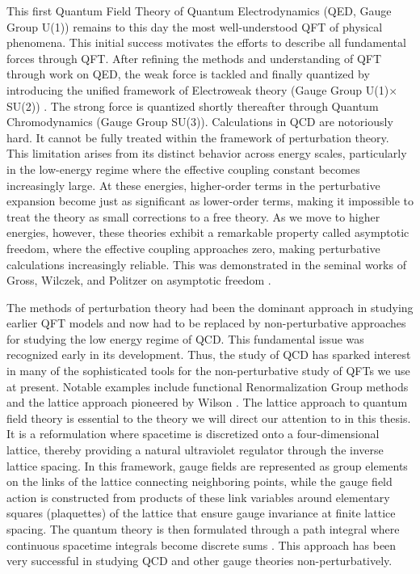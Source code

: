 This first Quantum Field Theory of Quantum Electrodynamics (QED, Gauge Group
U(1)) remains to this day the most well-understood QFT of physical phenomena.
This initial success motivates the efforts to describe all fundamental forces
through QFT. After refining the methods and understanding of QFT through work
on QED, the weak force is tackled and finally quantized by introducing the
unified framework of Electroweak theory (Gauge Group U(1)$\times$SU(2))
\cite{glashowRenormalizabilityVectorMeson1959,salamWeakElectromagneticInteractions1959,weinbergModelLeptons1967}.
The strong force is quantized shortly thereafter through Quantum Chromodynamics
(Gauge Group
SU(3))\cite{grossUltravioletBehaviorNonAbelian1973,politzerReliablePerturbativeResults1973}.
Calculations in QCD are notoriously hard. It cannot be fully treated within the
framework of perturbation theory. This limitation arises from its distinct
behavior across energy scales, particularly in the low-energy regime where the
effective coupling constant becomes increasingly large. At these energies,
higher-order terms in the perturbative expansion become just as significant as
lower-order terms, making it impossible to treat the theory as small
corrections to a free theory. As we move to higher energies, however, these
theories exhibit a remarkable property called asymptotic freedom, where the
effective coupling approaches zero, making perturbative calculations
increasingly reliable. This was demonstrated in the seminal works of Gross,
Wilczek, and Politzer on asymptotic freedom
\cite{grossAsymptoticallyFreeGauge1973,davidpolitzerAsymptoticFreedomApproach1974}.

The methods of perturbation theory had been the dominant approach in studying
earlier QFT models and now had to be replaced by non-perturbative approaches
for studying the low energy regime of QCD. This fundamental issue was
recognized early in its development. Thus, the study of QCD has sparked
interest in many of the sophisticated tools for the non-perturbative study of
QFTs we use at present. Notable examples include functional Renormalization
Group methods and the lattice approach pioneered by Wilson
\cite{wilsonConfinementQuarks1974}. The lattice approach to quantum field
theory is essential to the theory we will direct our attention to in this
thesis. It is a reformulation where spacetime is discretized onto a
four-dimensional lattice, thereby providing a natural ultraviolet regulator
through the inverse lattice spacing. In this framework, gauge fields are
represented as group elements on the links of the lattice connecting
neighboring points, while the gauge field action is constructed from products
of these link variables around elementary squares (plaquettes) of the lattice
that ensure gauge invariance at finite lattice spacing. The quantum theory is
then formulated through a path integral where continuous spacetime integrals
become discrete sums \cite{munsterLatticeGaugeTheory2000}. This approach has
been very successful in studying QCD and other gauge theories
non-perturbatively.


